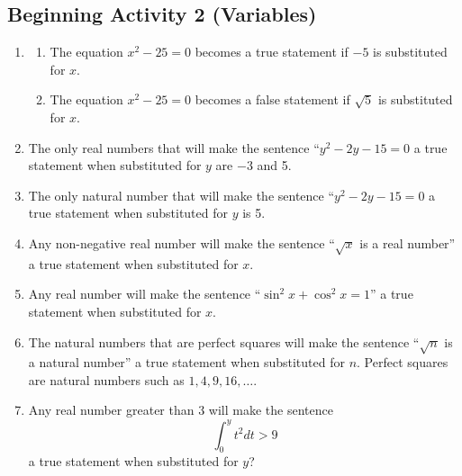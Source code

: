 \documentclass[11pt]{article}
\begin{document}
\subsection*{Beginning Activity 2 (Variables)}
\begin{enumerate}
  \item \begin{enumerate}
    \item The equation $x^2 - 25 = 0$ becomes a true statement if $-5$ is substituted for $x$.
    \item The equation $x^2 - 25 = 0$ becomes a false statement if $\sqrt{5}$ is substituted for $x$.
\end{enumerate}

  \item The only real numbers that will make the sentence ``$y^2 - 2y - 15 = 0$ a true statement when substituted for $y$ are $-3$ and 5.

  \item The only natural number that will make the sentence ``$y^2 - 2y - 15 = 0$ a true statement when substituted for $y$ is 5.

  \item Any non-negative real number will make the sentence ``$\sqrt{x}$  is a real number'' a true statement when substituted for $x$.

  \item Any real number will make the sentence ``$\sin ^2 x + \cos ^2 x = 1$'' a true statement when substituted for  $x$.


  \item The natural numbers that are perfect squares will make the sentence ``$\sqrt{n}$ is a natural number'' a true statement when substituted for $n$.  Perfect squares are natural numbers such as $1, 4, 9, 16,  \ldots $.

  \item Any real number greater than 3 will make the sentence 
  \[
   \int_0^y {t^2 dt > 9}
  \]
   a true statement when substituted for  $y$?
\end{enumerate}

\hbreak
\end{document}
